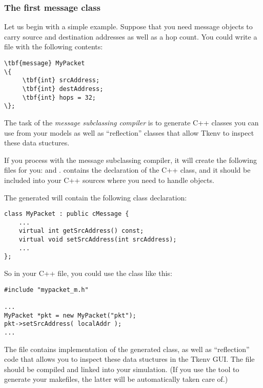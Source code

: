 \subsubsection{The first message class}

Let us begin with a simple example. Suppose that you need message objects to
carry source and destination addresses as well as a hop count. You could write
a  file with the following contents:

\begin{Verbatim}[commandchars=\\\{\}]
\tbf{message} MyPacket
\{
     \tbf{int} srcAddress;
     \tbf{int} destAddress;
     \tbf{int} hops = 32;
\};
\end{Verbatim}

The task of the \textit{message subclassing compiler} is to generate C++ classes
you can use from your models as well as ``reflection'' classes that allow
Tkenv to inspect these data stuctures.

If you process  with the message subclassing compiler, it will
create the following files for you:  and .
 contains the declaration of the  C++ class, and
it should be included into your C++ sources where you need to handle
 objects.

The generated  will contain the following class declaration:

\begin{verbatim}
class MyPacket : public cMessage {
    ...
    virtual int getSrcAddress() const;
    virtual void setSrcAddress(int srcAddress);
    ...
};
\end{verbatim}

So in your C++ file, you could use the  class like this:

\begin{verbatim}
#include "mypacket_m.h"

...
MyPacket *pkt = new MyPacket("pkt");
pkt->setSrcAddress( localAddr );
...
\end{verbatim}

The  file contains implementation of the generated 
class, as well as ``reflection'' code that allows you to inspect these data
stuctures in the Tkenv GUI. The  file should be compiled and
linked into your simulation. (If you use the  tool
to generate your makefiles, the latter will be automatically taken care of.)


